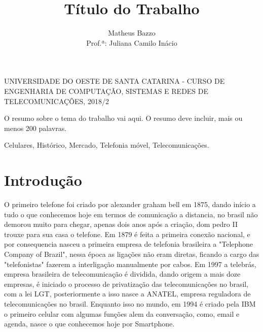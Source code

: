\documentclass{sbrt2018port}
\begin{document}
\title{Título do Trabalho}

\author{ Matheus Bazzo \\
Prof.ª: Juliana Camilo Inácio}

\maketitle

 {UNIVERSIDADE DO OESTE DE SANTA CATARINA - CURSO DE ENGENHARIA DE COMPUTAÇÃO, SISTEMAS E REDES DE TELECOMUNICAÇÕES, 2018/2}

\begin{resumo}
O resumo sobre o tema do trabalho vai aqui. O resumo deve incluir, mais ou menos 200 palavras.
\end{resumo}

\begin{chave}
Celulares, Histórico, Mercado, Telefonia móvel, Telecomunicações.
\end{chave}

\section{Introdução}

O primeiro telefone foi criado por alexander graham bell em 1875, dando início a tudo o que conhecemos hoje em termos de comunicação a distancia, no brasil não demorou muito para chegar, apenas dois anos após a criação, dom pedro II trouxe para sua casa o telefone.
Em 1879 é feita a primeira conexão nacional, e por consequencia nasceu a primeira empresa de telefonia brasileira a "Telephone Company of Brazil", nessa época as ligações não eram diretas, ficando a cargo das "telefonistas" fazerem a interligação manualmente por cabos.
Em 1997 a telebrás, empresa brasileira de telecomunicação é dividida, dando origem a mais doze empresas, é iniciado o processo de privatização das telecomunicações no brasil, com a lei LGT, posteriormente a isso nasce a ANATEL, empresa reguladora de telecomunicações no brasil.
Enquanto isso no mundo, em 1994 é criado pela IBM o primeiro celular com algumas funções alem da conversação, como, email e agenda, nasce o que conhecemos hoje por Smartphone.
\end{document}
